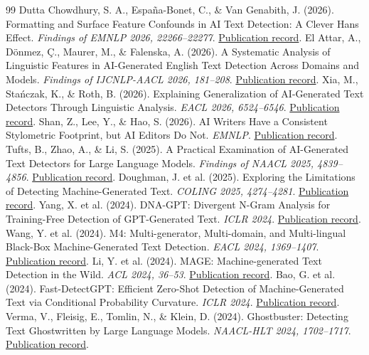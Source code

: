 \begin{thebibliography}{99}
 Dutta Chowdhury, S. A., España-Bonet, C., \& Van Genabith, J. (2026). Formatting and Surface Feature Confounds in AI Text Detection: A Clever Hans Effect. \emph{Findings of EMNLP 2026, 22266–22277}. \href{https://aclanthology.org/2026.findings-emnlp.1051/}{Publication record}.
 El Attar, A., Dönmez, Ç., Maurer, M., \& Falenska, A. (2026). A Systematic Analysis of Linguistic Features in AI-Generated English Text Detection Across Domains and Models. \emph{Findings of IJCNLP-AACL 2026, 181–208}. \href{https://aclanthology.org/2026.findings-aacl.10/}{Publication record}.
 Xia, M., Stańczak, K., \& Roth, B. (2026). Explaining Generalization of AI-Generated Text Detectors Through Linguistic Analysis. \emph{EACL 2026, 6524–6546}. \href{https://aclanthology.org/2026.eacl-long.307/}{Publication record}.
 Shan, Z., Lee, Y., \& Hao, S. (2026). AI Writers Have a Consistent Stylometric Footprint, but AI Editors Do Not. \emph{EMNLP}. \href{https://aclanthology.org/2026.emnlp-main.1725/}{Publication record}.
 Tufts, B., Zhao, A., \& Li, S. (2025). A Practical Examination of AI-Generated Text Detectors for Large Language Models. \emph{Findings of NAACL 2025, 4839–4856}. \href{https://aclanthology.org/2025.findings-naacl.271/}{Publication record}.
 Doughman, J. et al. (2025). Exploring the Limitations of Detecting Machine-Generated Text. \emph{COLING 2025, 4274–4281}. \href{https://aclanthology.org/2025.coling-main.288/}{Publication record}.
 Yang, X. et al. (2024). DNA-GPT: Divergent N-Gram Analysis for Training-Free Detection of GPT-Generated Text. \emph{ICLR 2024}. \href{https://arxiv.org/abs/2305.17359}{Publication record}.
 Wang, Y. et al. (2024). M4: Multi-generator, Multi-domain, and Multi-lingual Black-Box Machine-Generated Text Detection. \emph{EACL 2024, 1369–1407}. \href{https://aclanthology.org/2024.eacl-long.83/}{Publication record}.
 Li, Y. et al. (2024). MAGE: Machine-generated Text Detection in the Wild. \emph{ACL 2024, 36–53}. \href{https://aclanthology.org/2024.acl-long.3/}{Publication record}.
 Bao, G. et al. (2024). Fast-DetectGPT: Efficient Zero-Shot Detection of Machine-Generated Text via Conditional Probability Curvature. \emph{ICLR 2024}. \href{https://arxiv.org/abs/2310.05130}{Publication record}.
 Verma, V., Fleisig, E., Tomlin, N., \& Klein, D. (2024). Ghostbuster: Detecting Text Ghostwritten by Large Language Models. \emph{NAACL-HLT 2024, 1702–1717}. \href{https://aclanthology.org/2024.naacl-long.95/}{Publication record}.

\end{thebibliography}
